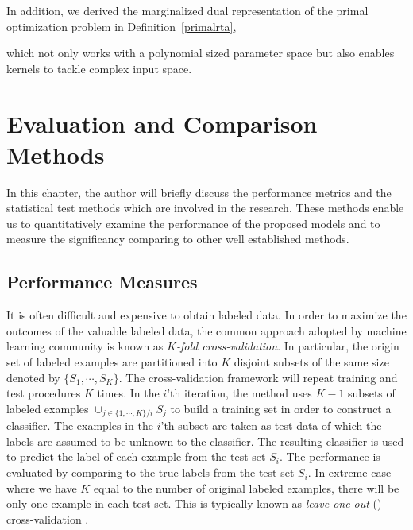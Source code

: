 {In addition, we derived the marginalized dual representation of the primal optimization problem in Definition~\ref{primalrta},

which not only works with a polynomial sized parameter space but also enables kernels to tackle complex input space.



%
\iffalse
\chapter{Evaluation and Comparison Methods} \label{ch_ecm}

In this chapter, the author will briefly discuss the performance metrics and the statistical test methods which are involved in the research. 
These methods enable us to quantitatively examine the performance of the proposed models and to measure the significancy comparing to other well established methods.

%
\section{Performance Measures} \label{sc_pm}

It is often difficult and expensive to obtain labeled data. 
In order to maximize the outcomes of the valuable labeled data, the common approach adopted by machine learning community is known as \textit{$K$-fold cross-validation}.
In particular, the origin set of labeled examples are partitioned into $K$ disjoint subsets of the same size denoted by $\{S_1,\cdots,S_K\}$.
The cross-validation framework will repeat training and test procedures $K$ times.
In the $i$'th iteration, the method uses $K-1$ subsets of labeled examples $\cup_{j\in\{1,\cdots,K\}/i}S_j$ to build a training set in order to construct a classifier.
The examples in the $i$'th subset are taken as test data of which the labels are assumed to be unknown to the classifier.
The resulting classifier is used to predict the label of each example from the test set $S_i$.
The performance is evaluated by comparing to the true labels from the test set $S_i$.
In extreme case where we have $K$ equal to the number of original labeled examples, there will be only one example in each test set.
This is typically known as \textit{leave-one-out} (\loo) {cross-validation} .

}

